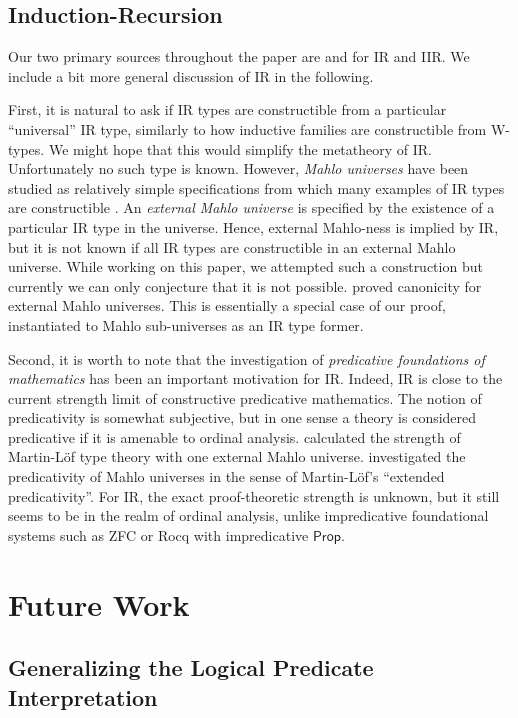 \documentclass[acmsmall,screen,review,anonymous]{acmart}
\newcommand{\msf}[1]{{\mathsf{#1}}}
\begin{document}
\subsection{Induction-Recursion} Our two primary sources throughout the paper are
\cite{DBLP:journals/apal/DybjerS03} and \cite{DBLP:journals/jlp/DybjerS06} for IR and IIR. We include
a bit more general discussion of IR in the following.

First, it is natural to ask if IR types are constructible from a particular ``universal'' IR type,
similarly to how inductive families are constructible from W-types. We might hope that this would
simplify the metatheory of IR. Unfortunately no such type is known. However, \emph{Mahlo universes}
have been studied as relatively simple specifications from which many examples of IR types
are constructible \cite{setzer00mahlo}. An \emph{external Mahlo universe} is specified by the
existence of a particular IR type in the universe. Hence, external Mahlo-ness is implied by IR, but
it is not known if all IR types are constructible in an external Mahlo universe. While working on
this paper, we attempted such a construction but currently we can only conjecture that it is not
possible. \citet{mahlo-canonicity} proved canonicity for external Mahlo universes. This is
essentially a special case of our proof, instantiated to Mahlo sub-universes as an IR type former.

Second, it is worth to note that the investigation of \emph{predicative foundations of mathematics}
has been an important motivation for IR. Indeed, IR is close to the current strength limit of
constructive predicative mathematics. The notion of predicativity is somewhat
subjective, but in one sense a theory is considered predicative if it is amenable to ordinal
analysis. \citet{setzer00mahlo} calculated the strength of Martin-Löf type theory with one external
Mahlo universe. \citet{DBLP:journals/logcom/DybjerS24} investigated the predicativity of Mahlo
universes in the sense of Martin-Löf's ``extended predicativity''. For IR, the exact proof-theoretic
strength is unknown, but it still seems to be in the realm of ordinal analysis, unlike
impredicative foundational systems such as ZFC or Rocq with impredicative $\msf{Prop}$.

\section{Future Work}\label{sec:future-work}

\subsection{Generalizing the Logical Predicate Interpretation} \label{sec:generalizing-the-logical-predicate}
\end{document}
